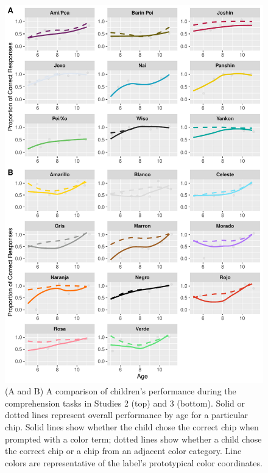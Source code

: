 \documentclass[
  english,
  ,man,floatsintext]{apa6}
\begin{document}
\begin{figure}
\centering
\includegraphics{amazon_color_files/figure-latex/comp-childfigure-1.pdf}
\caption{\label{fig:comp-childfigure}(A and B) A comparison of children's performance during the comprehension tasks in Studies 2 (top) and 3 (bottom). Solid or dotted lines represent overall performance by age for a particular chip. Solid lines show whether the child chose the correct chip when prompted with a color term; dotted lines show whether a child chose the correct chip or a chip from an adjacent color category. Line colors are representative of the label's prototypical color coordinates.}
\end{figure}
\end{document}
